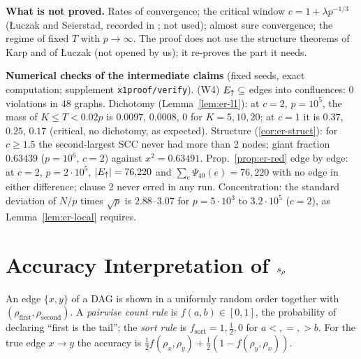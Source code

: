 \textbf{What is not proved.} Rates of convergence; the critical window
$c=1+\lambda p^{-1/3}$ (\L{}uczak and Seierstad, recorded in
\citealp{dovgal2020birth}; not used); almost sure convergence; the regime of
fixed $T$ with $p\to\infty$. The proof does not use the structure theorems of
Karp and of \L{}uczak (not opened by us); it re-proves the part it needs.

\textbf{Numerical checks of the intermediate claims} (fixed seeds, exact
computation; supplement \texttt{x1proof/verify}). (W4) $E_{\uparrow}\subseteq$ edges into
confluences: 0 violations in 48 graphs. Dichotomy (Lemma~\ref{lem:er-l1}): at
$c=2$, $p=10^5$, the mass of $K\le T<0.02p$ is $0.0097$, $0.0008$, $0$ for
$K=5,10,20$; at $c=1$ it is $0.37$, $0.25$, $0.17$ (critical, no dichotomy, as
expected). Structure (\cref{cor:er-struct}): for $c\ge1.5$ the second-largest
SCC never had more than 2 nodes; giant fraction $0.63439$ ($p=10^6$, $c=2$)
against $x^2=0.63491$. Prop.~\ref{prop:er-red} edge by edge: at $c=2$,
$p=2\cdot10^5$, $|E_{\uparrow}|=76{,}220$ and $\sum_e\Psi_{40}(e)=76{,}220$ with no edge
in either difference; clause 2 never erred in any run. Concentration: the
standard deviation of $N/p$ times $\sqrt p$ is $2.88$--$3.07$ for
$p=5\cdot10^3$ to $3.2\cdot10^5$ ($c=2$), as Lemma~\ref{lem:er-local} requires.

\section{Accuracy Interpretation of $s_\rho$}
\label{app:x3}

An edge $\{x,y\}$ of a DAG is shown in a uniformly random order together with
$(\rho_{\mathrm{first}},\rho_{\mathrm{second}})$. A \emph{pairwise count rule} is
$f(a,b)\in[0,1]$, the probability of declaring ``first is the tail''; the
\emph{sort rule} is $f_{\mathrm{sort}}=1,\tfrac12,0$ for $a<,=,>b$. For the true
edge $x\to y$ the accuracy is $\tfrac12f(\rho_x,\rho_y)+\tfrac12(1-f(\rho_y,\rho_x))$.

